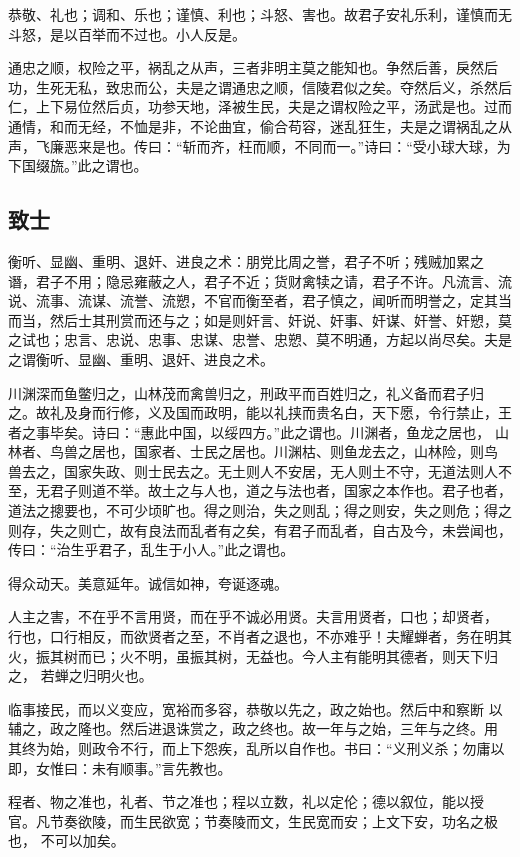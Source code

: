\documentclass[]{article}
\begin{document}
恭敬、礼也；调和、乐也；谨慎、利也；斗怒、害也。故君子安礼乐利，谨慎而无斗怒，是以百举而不过也。小人反是。

通忠之顺，权险之平，祸乱之从声，三者非明主莫之能知也。争然后善，戾然后功，生死无私，致忠而公，夫是之谓通忠之顺，信陵君似之矣。夺然后义，杀然后仁，上下易位然后贞，功参天地，泽被生民，夫是之谓权险之平，汤武是也。过而通情，和而无经，不恤是非，不论曲宜，偷合苟容，迷乱狂生，夫是之谓祸乱之从声，飞廉恶来是也。传曰：``斩而齐，枉而顺，不同而一。''诗曰：``受小球大球，为下国缀旒。''此之谓也。

\hypertarget{header-n64}{%
\subsection{致士}\label{header-n64}}

衡听、显幽、重明、退奸、进良之术：朋党比周之誉，君子不听；残贼加累之
谮，君子不用；隐忌雍蔽之人，君子不近；货财禽犊之请，君子不许。凡流言、流说、流事、流谋、流誉、流愬，不官而衡至者，君子慎之，闻听而明誉之，定其当
而当，然后士其刑赏而还与之；如是则奸言、奸说、奸事、奸谋、奸誉、奸愬，莫
之试也；忠言、忠说、忠事、忠谋、忠誉、忠愬、莫不明通，方起以尚尽矣。夫是
之谓衡听、显幽、重明、退奸、进良之术。

川渊深而鱼鳖归之，山林茂而禽兽归之，刑政平而百姓归之，礼义备而君子归
之。故礼及身而行修，义及国而政明，能以礼挟而贵名白，天下愿，令行禁止，王
者之事毕矣。诗曰：``惠此中国，以绥四方。''此之谓也。川渊者，鱼龙之居也，
山林者、鸟兽之居也，国家者、士民之居也。川渊枯、则鱼龙去之，山林险，则鸟
兽去之，国家失政、则士民去之。无土则人不安居，无人则土不守，无道法则人不
至，无君子则道不举。故土之与人也，道之与法也者，国家之本作也。君子也者，
道法之摠要也，不可少顷旷也。得之则治，失之则乱；得之则安，失之则危；得之
则存，失之则亡，故有良法而乱者有之矣，有君子而乱者，自古及今，未尝闻也，
传曰：``治生乎君子，乱生于小人。''此之谓也。

得众动天。美意延年。诚信如神，夸诞逐魂。

人主之害，不在乎不言用贤，而在乎不诚必用贤。夫言用贤者，口也；却贤者，
行也，口行相反，而欲贤者之至，不肖者之退也，不亦难乎！夫耀蝉者，务在明其
火，振其树而已；火不明，虽振其树，无益也。今人主有能明其德者，则天下归之，
若蝉之归明火也。

临事接民，而以义变应，宽裕而多容，恭敬以先之，政之始也。然后中和察断
以辅之，政之隆也。然后进退诛赏之，政之终也。故一年与之始，三年与之终。用
其终为始，则政令不行，而上下怨疾，乱所以自作也。书曰：``义刑义杀；勿庸以
即，女惟曰：未有顺事。''言先教也。

程者、物之准也，礼者、节之准也；程以立数，礼以定伦；德以叙位，能以授
官。凡节奏欲陵，而生民欲宽；节奏陵而文，生民宽而安；上文下安，功名之极也，
不可以加矣。
\end{document}
